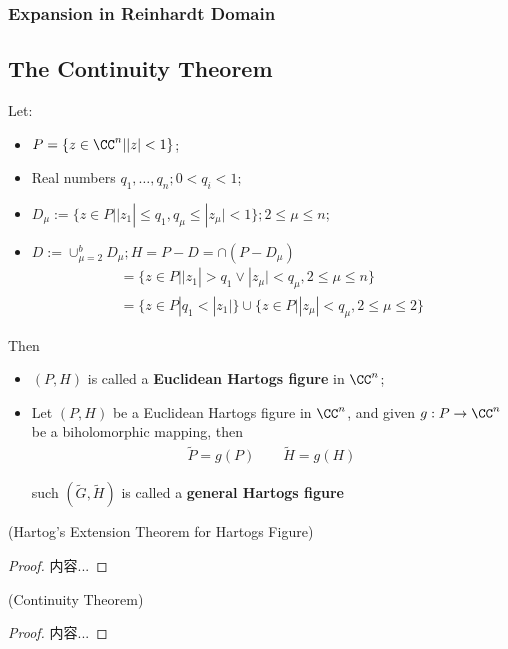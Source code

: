 \documentclass[Total.tex]{subfiles}
\begin{document}
		\subsubsection{Expansion in Reinhardt Domain}
		\subsection{The Continuity Theorem}
			\begin{Def}
				Let: 
				\begin{itemize}
					\item $P=\{z\in \CC^n||z|<1\}$;
					\item Real numbers $q_1,\dots,q_n;0<q_i<1$;
					\item $D_\mu:=\{z\in P||z_1|\leq q_1,q_\mu\leq |z_\mu|<1\};2\leq \mu\leq n$;
					\item $D:=\cup_{\mu=2}^b D_\mu;H=P-D=\cap (P-D_\mu)$
					\begin{gather*}
						=\{z\in P||z_1|>q_1\vee |z_\mu|<q_\mu,2\leq \mu\leq n\}\\
						=\{z\in P|q_1<|z_1|\}\cup \{z\in P||z_\mu|<q_\mu,2\leq \mu\leq 2\}
					\end{gather*}
				\end{itemize}
				
				Then
				\begin{itemize}
					\item $(P,H)$ is called a \textbf{Euclidean Hartogs figure} in $\CC^n$;
					\item Let $(P,H)$ be a Euclidean Hartogs figure in $\CC^n$, and given $g:P\rightarrow \CC^n$ be a biholomorphic mapping, then
					\begin{gather*}
						\tilde{P}=g(P)\qquad \tilde{H}=g(H)
					\end{gather*}
					
					such $(\tilde{G},\tilde{H})$ is called a \textbf{general Hartogs figure}
				\end{itemize}
			\end{Def}
			
			\begin{theorem}
				(Hartog's Extension Theorem for Hartogs Figure)
			\end{theorem}
			\begin{proof}
				内容...
			\end{proof}
			
			\begin{theorem}
				(Continuity Theorem)
			\end{theorem}
			\begin{proof}
				内容...
			\end{proof}
			
\end{document}
